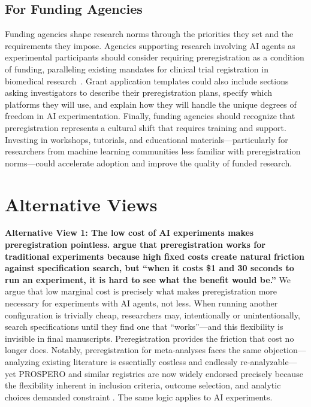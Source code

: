 \documentclass{article}
\theoremstyle{plain}
\theoremstyle{definition}
\theoremstyle{remark}
\begin{document}
\subsection{For Funding Agencies}
Funding agencies shape research norms through the priorities they set and the requirements they impose. Agencies supporting research involving AI agents as experimental participants should consider requiring preregistration as a condition of funding, paralleling existing mandates for clinical trial registration in biomedical research~\citep{NIH2016dissemination}. Grant application templates could also include sections asking investigators to describe their preregistration plans, specify which platforms they will use, and explain how they will handle the unique degrees of freedom in AI experimentation. Finally, funding agencies should recognize that preregistration represents a cultural shift that requires training and support. Investing in workshops, tutorials, and educational materials—particularly for researchers from machine learning communities less familiar with preregistration norms—could accelerate adoption and improve the quality of funded research.

\section{Alternative Views}

\textbf{Alternative View 1: The low cost of AI experiments makes preregistration pointless. \citet{horton2023large} argue that preregistration works for traditional experiments because high fixed costs create natural friction against specification search, but ``when it costs \$1 and 30 seconds to run an experiment, it is hard to see what the benefit would be.''} We argue that low marginal cost is precisely what makes preregistration more necessary for experiments with AI agents, not less. When running another configuration is trivially cheap, researchers may, intentionally or unintentionally, search specifications until they find one that ``works''—and this flexibility is invisible in final manuscripts. Preregistration provides the friction that cost no longer does. Notably, preregistration for meta-analyses faces the same objection—analyzing existing literature is essentially costless and endlessly re-analyzable—yet PROSPERO and similar registries are now widely endorsed precisely because the flexibility inherent in inclusion criteria, outcome selection, and analytic choices demanded constraint \citep{stewart2012prospective}. The same logic applies to AI experiments.
\end{document}
